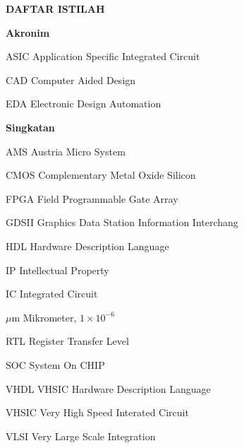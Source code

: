 \newpage
{}
\singlespacing

\begin{center}
	\begin{large}\textbf{DAFTAR ISTILAH}\end{large}
\end{center}
\vspace{1cm}


\noindent \begin{large}\textbf{Akronim}\end{large}
	\begin{abbreviations}
		\item[ASIC] Application Specific Integrated Circuit
		\item[CAD] Computer Aided Design
		\item[EDA] Electronic Design Automation
		
	\end{abbreviations}
	
	
	\vspace{1cm}
	\noindent \begin{large}\textbf{Singkatan}\end{large}
	\begin{abbreviations}
		\item[AMS] Austria Micro System
		\item[CMOS] Complementary Metal Oxide Silicon
		\item[FPGA] Field Programmable Gate Array
		\item[GDSII] Graphics Data Station Information Interchang
		\item[HDL] Hardware Description Language
		\item[IP] Intellectual Property
		\item[IC] Integrated Circuit
		\item[$\mu$m] Mikrometer, $1 \times 10^{-6}$
		\item[RTL] Register Transfer Level
		\item[SOC] System On CHIP
		\item[VHDL] VHSIC Hardware Description Language
		\item[VHSIC] Very High Speed Interated Circuit
		\item[VLSI] Very Large Scale Integration
	\end{abbreviations}


